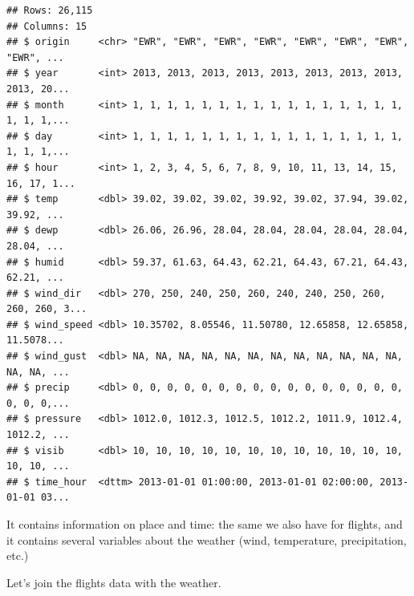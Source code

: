 \documentclass[]{tufte-book}
\newenvironment{Shaded}{}{}
\newcommand{\KeywordTok}[1]{\textcolor[rgb]{0.00,0.44,0.13}{\textbf{#1}}}
\newcommand{\NormalTok}[1]{#1}
\newcommand{\OperatorTok}[1]{\textcolor[rgb]{0.40,0.40,0.40}{#1}}
\newcommand{\StringTok}[1]{\textcolor[rgb]{0.25,0.44,0.63}{#1}}
\begin{document}
\begin{verbatim}
## Rows: 26,115
## Columns: 15
## $ origin     <chr> "EWR", "EWR", "EWR", "EWR", "EWR", "EWR", "EWR", "EWR", ...
## $ year       <int> 2013, 2013, 2013, 2013, 2013, 2013, 2013, 2013, 2013, 20...
## $ month      <int> 1, 1, 1, 1, 1, 1, 1, 1, 1, 1, 1, 1, 1, 1, 1, 1, 1, 1, 1,...
## $ day        <int> 1, 1, 1, 1, 1, 1, 1, 1, 1, 1, 1, 1, 1, 1, 1, 1, 1, 1, 1,...
## $ hour       <int> 1, 2, 3, 4, 5, 6, 7, 8, 9, 10, 11, 13, 14, 15, 16, 17, 1...
## $ temp       <dbl> 39.02, 39.02, 39.02, 39.92, 39.02, 37.94, 39.02, 39.92, ...
## $ dewp       <dbl> 26.06, 26.96, 28.04, 28.04, 28.04, 28.04, 28.04, 28.04, ...
## $ humid      <dbl> 59.37, 61.63, 64.43, 62.21, 64.43, 67.21, 64.43, 62.21, ...
## $ wind_dir   <dbl> 270, 250, 240, 250, 260, 240, 240, 250, 260, 260, 260, 3...
## $ wind_speed <dbl> 10.35702, 8.05546, 11.50780, 12.65858, 12.65858, 11.5078...
## $ wind_gust  <dbl> NA, NA, NA, NA, NA, NA, NA, NA, NA, NA, NA, NA, NA, NA, ...
## $ precip     <dbl> 0, 0, 0, 0, 0, 0, 0, 0, 0, 0, 0, 0, 0, 0, 0, 0, 0, 0, 0,...
## $ pressure   <dbl> 1012.0, 1012.3, 1012.5, 1012.2, 1011.9, 1012.4, 1012.2, ...
## $ visib      <dbl> 10, 10, 10, 10, 10, 10, 10, 10, 10, 10, 10, 10, 10, 10, ...
## $ time_hour  <dttm> 2013-01-01 01:00:00, 2013-01-01 02:00:00, 2013-01-01 03...
\end{verbatim}

It contains information on place and time: the same we also have for flights, and it contains several variables about the weather (wind, temperature, precipitation, etc.)

Let's join the flights data with the weather.

\begin{Shaded}
\end{Shaded}
\end{document}
